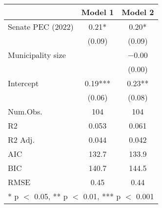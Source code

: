 \begin{table}[h]
\centering
\begin{tabular}[t]{lcc}
\toprule
  & Model 1 & Model 2\\
\midrule
Senate PEC (2022) & \num{0.21}* & \num{0.20}*\\
 & (\num{0.09}) & (\num{0.09})\\
Municipality size &  & \num{-0.00}\\
 &  & (\num{0.00})\\
Intercept & \num{0.19}*** & \num{0.23}**\\
 & (\num{0.06}) & (\num{0.08})\\
\midrule
Num.Obs. & \num{104} & \num{104}\\
R2 & \num{0.053} & \num{0.061}\\
R2 Adj. & \num{0.044} & \num{0.042}\\
AIC & \num{132.7} & \num{133.9}\\
BIC & \num{140.7} & \num{144.5}\\
RMSE & \num{0.45} & \num{0.44}\\
\bottomrule
\multicolumn{3}{l}{\rule{0pt}{1em}* p $<$ 0.05, ** p $<$ 0.01, *** p $<$ 0.001}\\
\end{tabular}
\end{table}
